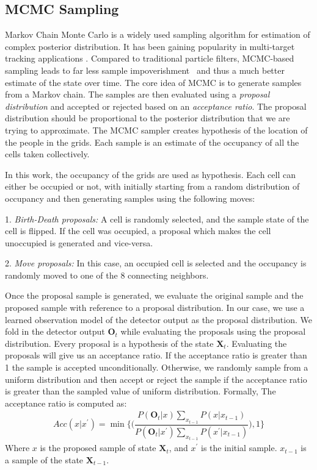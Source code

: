 \subsection{MCMC Sampling}
\label{MCMC}
Markov Chain Monte Carlo is a widely used sampling algorithm for estimation of complex posterior distribution. It has been gaining popularity in multi-target tracking applications \cite{khan2004mcmc}. Compared to traditional particle filters, MCMC-based sampling leads to far less sample impoverishment%
~and thus a much better estimate of the state over time. The core idea of MCMC is to generate samples from a Markov chain. The samples are then evaluated using a \textit{proposal distribution} and accepted or rejected based on an \textit{acceptance ratio}. The proposal distribution should be proportional to the posterior distribution that we are trying to approximate. The MCMC sampler creates hypothesis of the location of the people in the grids. Each sample is an estimate of the occupancy of all the cells taken collectively. 

In this work, the occupancy of the grids are used as hypothesis. Each cell can either be occupied or not, with initially starting from a random distribution of occupancy and then generating samples using the following moves:

1. \textit{Birth-Death proposals:}
A cell is randomly selected, and the sample state of the cell is flipped. If the cell was occupied, a proposal which makes the cell unoccupied is generated and vice-versa.

2. \textit{Move proposals:}
In this case, an occupied cell is selected and the occupancy is randomly moved to one of the 8 connecting neighbors.

Once the proposal sample is generated, we evaluate the original sample and the proposed sample with reference to a proposal distribution. In our case, we use a learned observation model of the detector output as the proposal distribution. We fold in the detector output $\textbf{O}_{t}$ while evaluating the proposals using the proposal distribution. Every proposal is a hypothesis of the state $\textbf{X}_{t}$.
Evaluating the proposals will give us an acceptance ratio. If the acceptance ratio is greater than 1 the sample is accepted unconditionally. 
Otherwise, we randomly sample from a uniform distribution and then accept or reject the sample if the acceptance ratio is greater than the sampled value of uniform distribution. Formally,
The acceptance ratio is computed as:
\begin{align}
Acc(x|x^{'}) = \min\Big\lbrace\Big(\dfrac{P(\textbf{O}_{t}|x)\sum\limits_{x_{t-1}} P(x|x_{t-1})}{P(\textbf{O}_{t}|x^{'})\sum\limits_{x_{t-1}} P(x^{'}|x_{t-1})}\Big),1\Big\rbrace
\end{align}
Where $x$ is the proposed sample of state $\textbf{X}_{t}$, and $x^{'}$ is the initial sample. $x_{t-1}$ is a sample of the state $\textbf{X}_{t-1}$.

